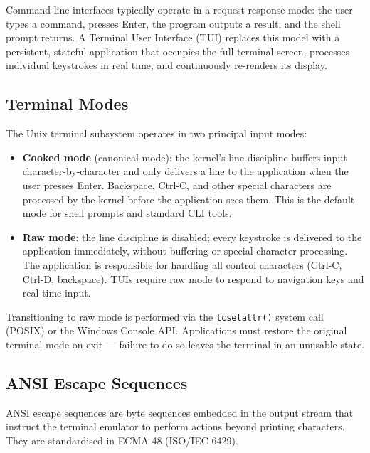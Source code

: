 Command-line interfaces typically operate in a request-response mode: the user types a command, presses Enter, the program outputs a result, and the shell prompt returns. A Terminal User Interface (TUI) replaces this model with a persistent, stateful application that occupies the full terminal screen, processes individual keystrokes in real time, and continuously re-renders its display.

\subsection{Terminal Modes}

The Unix terminal subsystem operates in two principal input modes:

\begin{itemize}
    \item \textbf{Cooked mode} (canonical mode): the kernel's line discipline buffers input character-by-character and only delivers a line to the application when the user presses Enter. Backspace, Ctrl-C, and other special characters are processed by the kernel before the application sees them. This is the default mode for shell prompts and standard CLI tools.
    \item \textbf{Raw mode}: the line discipline is disabled; every keystroke is delivered to the application immediately, without buffering or special-character processing. The application is responsible for handling all control characters (Ctrl-C, Ctrl-D, backspace). TUIs require raw mode to respond to navigation keys and real-time input.
\end{itemize}

Transitioning to raw mode is performed via the \texttt{tcsetattr()} system call (POSIX) or the Windows Console API. Applications must restore the original terminal mode on exit — failure to do so leaves the terminal in an unusable state.

\subsection{ANSI Escape Sequences}

ANSI escape sequences are byte sequences embedded in the output stream that instruct the terminal emulator to perform actions beyond printing characters. They are standardised in ECMA-48 (ISO/IEC 6429).

